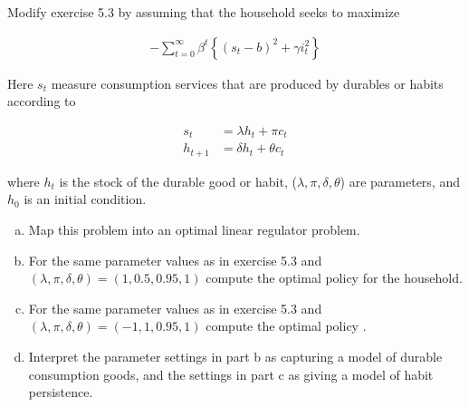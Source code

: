 
\begin{homeworkProblem}[Problem 5.4]

  Modify exercise 5.3 by assuming that the household seeks to maximize

  \begin{align} \label{eq:p4e1}
    - \sum_{t=0}^{\infty} \beta^t \left\{ (s_t - b)^2 + \gamma i_t^2\right\}
  \end{align}

  Here $s_t$ measure consumption services that are produced by durables or habits according to

  \begin{align} \label{eq:p4e2}
    s_t &= \lambda h_t + \pi c_t \\
    h _{t+1} &= \delta h_t + \theta c_t
  \end{align}

  where $h_t$ is the stock of the durable good or habit, ($\lambda, \pi, \delta, \theta$) are parameters, and $h_0$ is an initial condition.

  \begin{enumerate}[a.]
    \item Map this problem into an optimal linear regulator problem.
    \item For the same parameter values as in exercise 5.3 and $(\lambda, \pi, \delta, \theta) = (1, 0.5, 0.95, 1)$ compute the optimal policy for the household.
    \item For the same parameter values as in exercise 5.3 and $(\lambda, \pi, \delta, \theta) = (-1, 1, 0.95, 1)$ compute the optimal policy .
    \item Interpret the parameter settings in part b as capturing a model of durable consumption goods, and the settings in part c as giving a model of habit persistence.
  \end{enumerate}

  \vspace{.2in}

\end{homeworkProblem}
